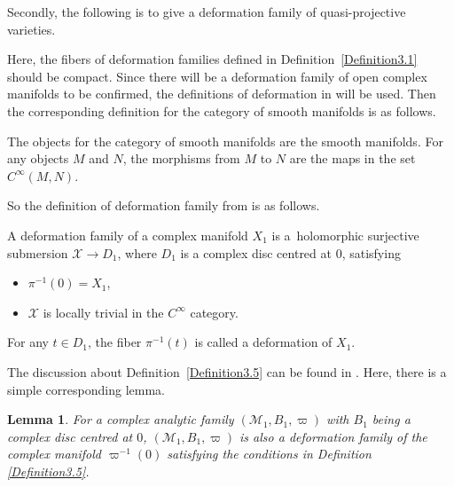 \documentclass[10pt,a4paper]{amsart}
\numberwithin{equation}{section}
\newtheorem{Lemma}[Theorem]{Lemma}
\begin{document}
Secondly, the following is to give a deformation family of quasi-projective varieties.

Here, the fibers of deformation families defined in Definition~\ref{Definition3.1} should be compact. Since there will be a deformation family of open complex manifolds to be confirmed, the definitions of deformation in \cite{Elizabeth-Francisco} will be used. Then the corresponding definition for the category of smooth manifolds is as follows.

\begin{Definition} \label{Definition3.4}
 The objects for the category of smooth manifolds are the smooth manifolds. For any objects $M$ and $N$, the morphisms from $M$ to $N$ are the maps in the set $C^\infty (M,N)$.
\end{Definition}

So the definition of deformation family from \cite{Elizabeth-Francisco} is as follows.

\begin{Definition} \label{Definition3.5}
 A deformation family of a complex manifold $X_1$ is a~holomorphic surjective submersion $\mathcal{X} \rightarrow D_1$, where $D_1$ is a complex disc centred at $0$, satisfying
\begin{itemize}\itemsep=0pt
\item[$(1)$] $\pi^{-1}(0)=X_1$,
\item[$(2)$] $\mathcal{X}$ is locally trivial in the $C^\infty$ category.
\end{itemize}
For any $t\in D_1$, the fiber $\pi^{-1}(t)$ is called a deformation of $X_1$.
\end{Definition}

The discussion about Definition~\ref{Definition3.5} can be found in \cite{Edoardo-Elizabeth-Francisco}. Here, there is a simple corresponding lemma.

\begin{Lemma} \label{Lemma3.6}
For a complex analytic family $(\mathcal{M}_1, B_1, \varpi)$ with $B_1$ being a complex disc centred at $0$, $(\mathcal{M}_1, B_1, \varpi)$ is also a deformation family of the complex manifold $\varpi^{-1}(0)$ satisfying the conditions in Definition {\rm\ref{Definition3.5}}.
\end{Lemma}
\end{document}
